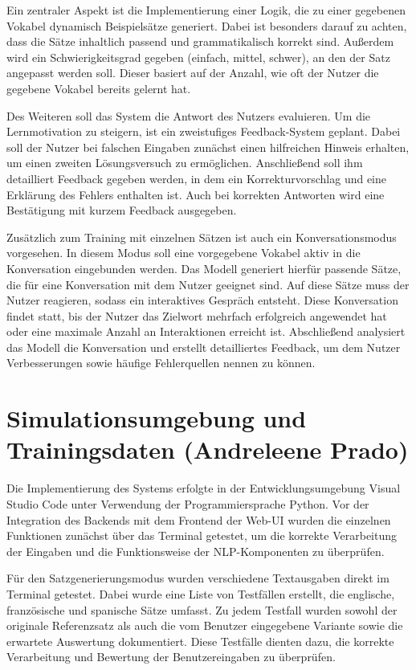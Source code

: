 Ein zentraler Aspekt ist die Implementierung einer Logik, die zu einer gegebenen Vokabel dynamisch Beispielsätze generiert.
Dabei ist besonders darauf zu achten, dass die Sätze inhaltlich passend und grammatikalisch korrekt sind.
Außerdem wird ein Schwierigkeitsgrad gegeben (einfach, mittel, schwer), an den der Satz angepasst werden soll. Dieser basiert auf 
der Anzahl, wie oft der Nutzer die gegebene Vokabel bereits gelernt hat. 

Des Weiteren soll das System die Antwort des Nutzers evaluieren. Um die Lernmotivation zu steigern, ist ein zweistufiges Feedback-System
geplant. Dabei soll der Nutzer bei falschen Eingaben zunächst einen hilfreichen Hinweis erhalten, um einen zweiten Lösungsversuch zu ermöglichen.
Anschließend soll ihm detailliert Feedback gegeben werden, in dem ein Korrekturvorschlag und eine Erklärung des Fehlers enthalten ist.
Auch bei korrekten Antworten wird eine Bestätigung mit kurzem Feedback ausgegeben.

Zusätzlich zum Training mit einzelnen Sätzen ist auch ein Konversationsmodus vorgesehen. In diesem Modus soll eine vorgegebene Vokabel
aktiv in die Konversation eingebunden werden. Das Modell generiert hierfür passende Sätze, die für eine Konversation mit 
dem Nutzer geeignet sind. Auf diese Sätze muss der Nutzer reagieren, sodass ein interaktives Gespräch entsteht.
Diese Konversation findet statt, bis der Nutzer das Zielwort mehrfach erfolgreich angewendet hat oder eine maximale
Anzahl an Interaktionen erreicht ist. Abschließend analysiert das Modell die Konversation und erstellt detailliertes Feedback,
um dem Nutzer Verbesserungen sowie häufige Fehlerquellen nennen zu können.

\section{Simulationsumgebung und Trainingsdaten (Andreleene Prado)}
Die Implementierung des Systems erfolgte in der Entwicklungsumgebung Visual Studio Code unter Verwendung der Programmiersprache Python. 
Vor der Integration des Backends mit dem Frontend der Web-UI wurden die einzelnen Funktionen zunächst über das Terminal getestet, um die korrekte Verarbeitung der Eingaben und die Funktionsweise der NLP-Komponenten zu überprüfen.

Für den Satzgenerierungsmodus wurden verschiedene Textausgaben direkt im Terminal getestet. 
Dabei wurde eine Liste von Testfällen erstellt, die englische, französische und spanische Sätze umfasst. 
Zu jedem Testfall wurden sowohl der originale Referenzsatz als auch die vom Benutzer eingegebene Variante sowie die erwartete Auswertung dokumentiert. 
Diese Testfälle dienten dazu, die korrekte Verarbeitung und Bewertung der Benutzereingaben zu überprüfen.

